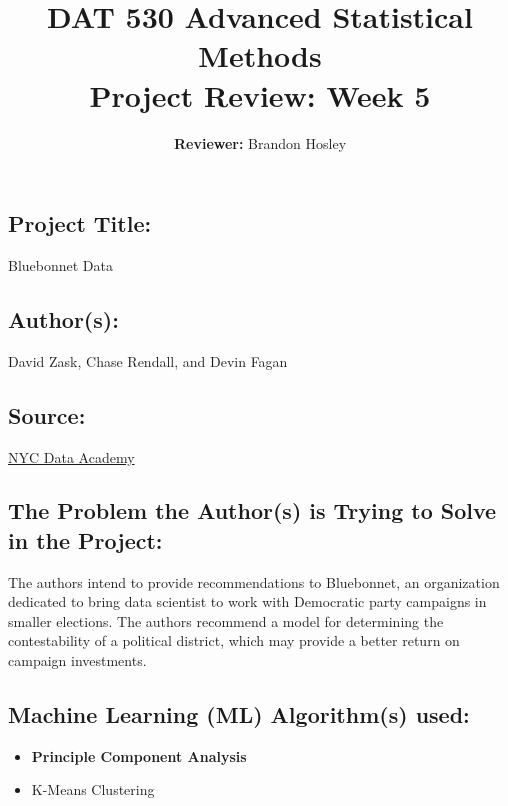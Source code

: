 \documentclass[]{article}
\title{\textbf{DAT 530 Advanced Statistical Methods}\\
	\normalsize{Project Review: Week 5} }
\author{\textbf{Reviewer: }
	Brandon Hosley}
\begin{document}
\setlength{\droptitle}{-10em} 
\pretitle{\begin{flushleft}\LARGE} %
	\posttitle{\end{flushleft}}
\preauthor{\begin{flushleft}\large} %
	\postauthor{\end{flushleft}}
\predate{\begin{flushleft}\large} %
	\postdate{\end{flushleft}}
\maketitle

\vspace{-2em}

\subsection*{Project Title:}
Bluebonnet Data

\subsection*{Author(s):}
David Zask, Chase Rendall, and Devin Fagan

\subsection*{Source:}
\href{https://nycdatascience.com/blog/student-works/bluebonnet-data/}{NYC Data Academy}

\subsection*{The Problem the Author(s) is Trying to Solve in the Project:}
The authors intend to provide recommendations to Bluebonnet, 
an organization dedicated to bring data scientist to work with Democratic party campaigns in smaller elections.
The authors recommend a model for determining the contestability of a political district, which may provide a better return on campaign investments.

\subsection*{Machine Learning (ML) Algorithm(s) used:}
\begin{itemize}
	\item \textbf{Principle Component Analysis}
	\item K-Means Clustering
\end{itemize}
\end{document}
